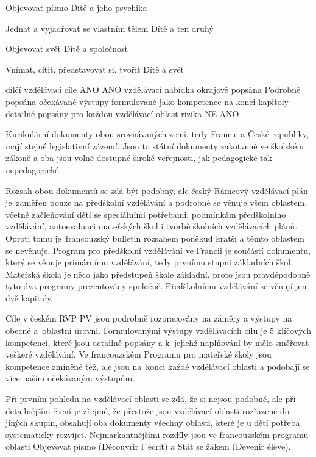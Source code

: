 Objevovat písmo
Dítě a jeho psychika

Jednat a vyjadřovat se vlastním tělem
Dítě a ten druhý

Objevovat svět
Dítě a společnost

Vnímat, cítit, představovat si, tvořit
Dítě a svět

dílčí vzdělávací cíle
ANO
ANO
vzdělávací nabídka
okrajově popsána
Podrobně popsána
očekávané výstupy
formulované jako kompetence na konci kapitoly
detailně popsány pro každou vzdělávací oblast
rizika
NE
ANO

Kurikulární dokumenty obou srovnávaných zemí, tedy Francie a České republiky, mají stejné legislativní zázemí. Jsou to státní dokumenty zakotvené ve školském zákoně a oba jsou volně dostupné široké veřejnosti, jak pedagogické tak nepedagogické. 

Rozsah obou dokumentů se zdá být podobný, ale český Rámcový vzdělávací plán je zaměřen pouze na předškolní vzdělávání a podrobně se věnuje všem oblastem, včetně začleňování dětí se speciálními potřebami, podmínkám předškolního vzdělávání, autoevaluaci mateřských škol i tvorbě školních vzdělávacích plánů. Oproti tomu je francouzský bulletin rozsahem poněkud kratší a těmto oblastem se nevěnuje. Program pro předškolní vzdělávání ve Francii je součástí dokumentu, který se věnuje primárnímu vzdělávání, tedy prvnímu stupni základních škol. Mateřská škola je něco jako předstupeň škole základní, proto jsou pravděpodobně tyto dva programy prezentovány společně. Předškolnímu vzdělávání se věnují jen dvě kapitoly.

Cíle v českém RVP PV jsou podrobně rozpracovány na záměry a výstupy na obecné a oblastní úrovni. Formulovanými výstupy vzdělávacích cílů je 5 klíčových kompetencí, které jsou detailně popsány a k jejichž naplňování by mělo směřovat veškeré vzdělávání. Ve francouzském Programu pro mateřské školy jsou kompetence zmíněné též, ale jsou na konci každé vzdělávací oblasti a podobají se více našim očekávaným výstupům.

Při prvním pohledu na vzdělávací oblasti se zdá, že si nejsou podobné, ale při detailnějším čtení je zřejmé, že přestože jsou vzdělávací oblasti rozřazené do jiných skupin, obsahují oba dokumenty všechny oblasti, které je u dětí potřeba systematicky rozvíjet. Nejmarkantnějšími rozdíly jsou ve francouzském programu oblasti Objevovat písmo (Découvrir l´écrit) a Stát se žákem (Devenir élève).

